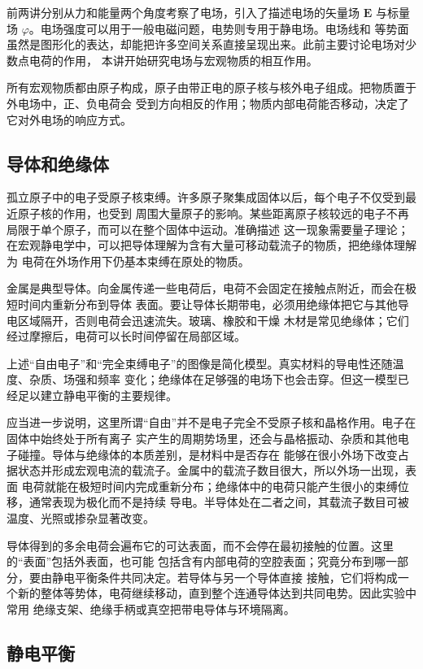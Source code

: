前两讲分别从力和能量两个角度考察了电场，引入了描述电场的矢量场
$\boldsymbol E$ 与标量场 $\varphi$。电场强度可以用于一般电磁问题，电势则专用于静电场。电场线和
等势面虽然是图形化的表达，却能把许多空间关系直接呈现出来。此前主要讨论电场对少数点电荷的作用，
本讲开始研究电场与宏观物质的相互作用。

所有宏观物质都由原子构成，原子由带正电的原子核与核外电子组成。把物质置于外电场中，正、负电荷会
受到方向相反的作用；物质内部电荷能否移动，决定了它对外电场的响应方式。

\subsection*{导体和绝缘体}

孤立原子中的电子受原子核束缚。许多原子聚集成固体以后，每个电子不仅受到最近原子核的作用，也受到
周围大量原子的影响。某些距离原子核较远的电子不再局限于单个原子，而可以在整个固体中运动。准确描述
这一现象需要量子理论；在宏观静电学中，可以把导体理解为含有大量可移动载流子的物质，把绝缘体理解为
电荷在外场作用下仍基本束缚在原处的物质。

金属是典型导体。向金属传递一些电荷后，电荷不会固定在接触点附近，而会在极短时间内重新分布到导体
表面。要让导体长期带电，必须用绝缘体把它与其他导电区域隔开，否则电荷会迅速流失。玻璃、橡胶和干燥
木材是常见绝缘体；它们经过摩擦后，电荷可以长时间停留在局部区域。

上述“自由电子”和“完全束缚电子”的图像是简化模型。真实材料的导电性还随温度、杂质、场强和频率
变化；绝缘体在足够强的电场下也会击穿。但这一模型已经足以建立静电平衡的主要规律。

应当进一步说明，这里所谓“自由”并不是电子完全不受原子核和晶格作用。电子在固体中始终处于所有离子
实产生的周期势场里，还会与晶格振动、杂质和其他电子碰撞。导体与绝缘体的本质差别，是材料中是否存在
能够在很小外场下改变占据状态并形成宏观电流的载流子。金属中的载流子数目很大，所以外场一出现，表面
电荷就能在极短时间内完成重新分布；绝缘体中的电荷只能产生很小的束缚位移，通常表现为极化而不是持续
导电。半导体处在二者之间，其载流子数目可被温度、光照或掺杂显著改变。

导体得到的多余电荷会遍布它的可达表面，而不会停在最初接触的位置。这里的“表面”包括外表面，也可能
包括含有内部电荷的空腔表面；究竟分布到哪一部分，要由静电平衡条件共同决定。若导体与另一个导体直接
接触，它们将构成一个新的整体等势体，电荷继续移动，直到整个连通导体达到共同电势。因此实验中常用
绝缘支架、绝缘手柄或真空把带电导体与环境隔离。

\subsection*{静电平衡}

